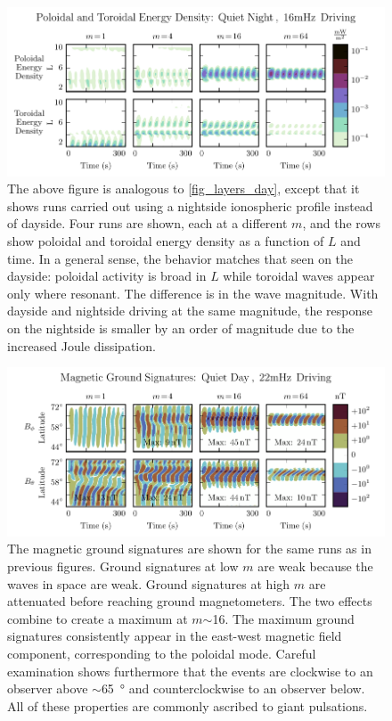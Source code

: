 \documentclass{article}
\newcommand{\about}{\ensuremath{\sim}}
\newcommand{\azm}{\ensuremath{m}\xspace}
\begin{document}
\begin{figure}
    \begin{center}
    \includegraphics[width=\textwidth]{figures/fig_layers_night.pdf}
    \caption{
        The above figure is analogous to \cref{fig_layers_day}, except that it shows runs carried out using a nightside ionospheric profile instead of dayside. Four runs are shown, each at a different \azm, and the rows show poloidal and toroidal energy density as a function of $L$ and time. In a general sense, the behavior matches that seen on the dayside: poloidal activity is broad in $L$ while toroidal waves appear only where resonant. The difference is in the wave magnitude. With dayside and nightside driving at the same magnitude, the response on the nightside is smaller by an order of magnitude due to the increased Joule dissipation.
    }
    \label{fig_layers_night}
    \end{center}
\end{figure}


\begin{figure}
    \begin{center}
    \includegraphics[width=\textwidth]{figures/fig_ground_day.pdf}
    \caption{
        The magnetic ground signatures are shown for the same runs as in previous figures. Ground signatures at low \azm are weak because the waves in space are weak. Ground signatures at high \azm are attenuated before reaching ground magnetometers. The two effects combine to create a maximum at \azm\about16. The maximum ground signatures consistently appear in the east-west magnetic field component, corresponding to the poloidal mode. Careful examination shows furthermore that the events are clockwise to an observer above \about\SI{65}{\degree} and counterclockwise to an observer below. All of these properties are commonly ascribed to giant pulsations.
    }
    \label{fig_ground_day}
    \end{center}
\end{figure}
\end{document}
